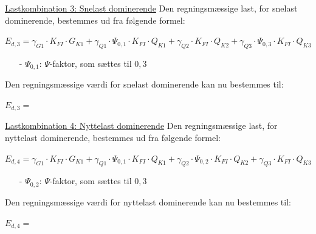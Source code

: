 \underline{Lastkombination 3: Snelast dominerende}
\newline
Den regningsmæssige last, for snelast dominerende, bestemmes ud fra følgende formel:
\begin{center}
 	$E_{d,3}=\gamma_{G1}\cdot K_{FI}\cdot G_{K1}+\gamma_{Q1}\cdot \Psi_{0,\!1}\cdot K_{FI}\cdot Q_{K1}+\gamma_{Q2}\cdot K_{FI}\cdot Q_{K2}+\gamma_{Q3}\cdot \Psi_{0,3}\cdot K_{FI}\cdot Q_{K3}$
\end{center}
\begin{itemize}
	\item[-] $\Psi_{0,\!1}$: $\Psi$-faktor, som sættes til $0,\!3$ \citep[ tabel A 1.1 anneks A.1.2.2]{EU90}
\end{itemize}
Den regningsmæssige værdi for snelast dominerende kan nu bestemmes til:
\begin{center}
	$E_{d,3}=$
\end{center}

\underline{Lastkombination 4: Nyttelast dominerende}
\newline
Den regningsmæssige last, for nyttelast dominerende, bestemmes ud fra følgende formel:
\begin{center}
	$E_{d,4}=\gamma_{G1}\cdot K_{FI}\cdot G_{K1}+\gamma_{Q1}\cdot \Psi_{0,\!1}\cdot K_{FI}\cdot Q_{K1}+\gamma_{Q2}\cdot \Psi_{0,\!2}\cdot K_{FI}\cdot Q_{K2}+\gamma_{Q3}\cdot K_{FI}\cdot Q_{K3}$
\end{center}
\begin{itemize}
	\item[-] $\Psi_{0,\!2}$: $\Psi$-faktor, som sættes til $0,\!3$ \citep[ tabel A 1.1 anneks A.1.2.2]{EU90}
\end{itemize}
Den regningsmæssige værdi for nyttelast dominerende kan nu bestemmes til:
\begin{center}
	$E_{d,4}=$
\end{center}